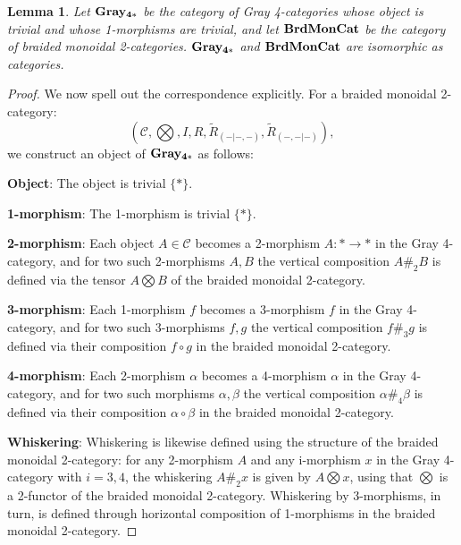 \documentclass[11pt, reqno]{amsart} %
\newcommand{\cC}{{\mathcal{C}}}
\newtheorem{lemma}[theorem]{Lemma}
\theoremstyle{definition}
\theoremstyle{remark}
\numberwithin{equation}{section}
\begin{document}
\begin{lemma}
Let ${\bf Gray_{4*}}$ be the category of Gray 4-categories whose object is trivial and whose 1-morphisms are trivial, and let ${\bf BrdMonCat}$ be the category of braided monoidal 2-categories. ${\bf Gray_{4*}}$ and ${\bf BrdMonCat}$ are isomorphic as categories.
\end{lemma}
\begin{proof}
We now spell out the correspondence explicitly. For a braided monoidal 2-category:
\[
  (\cC, \bigotimes, I, R, \tilde{R}_{(-|-,-)}, \tilde{R}_{(-,-|-)} ),
\]
we construct an object of ${\bf Gray_{4*}}$ as follows:

\vspace{.5em}
\noindent
\textbf{Object}: The object is trivial $\{*\}$. 

\vspace{.5em}
\noindent
\textbf{1-morphism}: The 1-morphism is trivial $\{*\}$.

\vspace{.5em}
\noindent
\textbf{2-morphism}: Each object $A \in \cC$ becomes a 2-morphism $A : * \rightarrow * $ in the Gray 4-category, and for two such 2-morphisms $A,B$ the vertical composition $A\#_2 B$ is defined via the tensor $A\bigotimes B$ of the braided monoidal 2-category. 

\vspace{.5em}
\noindent
\textbf{3-morphism}: Each 1-morphism $f$ becomes a 3-morphism $f$ in the Gray 4-category, and for two such 3-morphisms $f,g$ the vertical composition $f\#_3 g$ is defined via their composition $f \circ g$ in the braided monoidal 2-category. 

\vspace{.5em}
\noindent
\textbf{4-morphism}: Each 2-morphism $\alpha$ becomes a 4-morphism $\alpha$ in the Gray 4-category, and for two such morphisms $\alpha, \beta$ the vertical composition $\alpha \#_4 \beta$ is defined via their composition $\alpha \circ \beta$ in the braided monoidal 2-category. 

\vspace{.5em}
\noindent
\textbf{Whiskering}: Whiskering is likewise defined using the structure of the braided monoidal 2-category: for any 2-morphism $A$ and any i-morphism $x$ in the Gray 4-category with $i = 3,4$, the whiskering $A \#_2 x$ is given by $A \bigotimes x$, using that $\bigotimes$ is a 2-functor of the braided monoidal 2-category. Whiskering by 3-morphisms, in turn, is defined through horizontal composition of 1-morphisms in the braided monoidal 2-category.


\end{proof}
\end{document}
